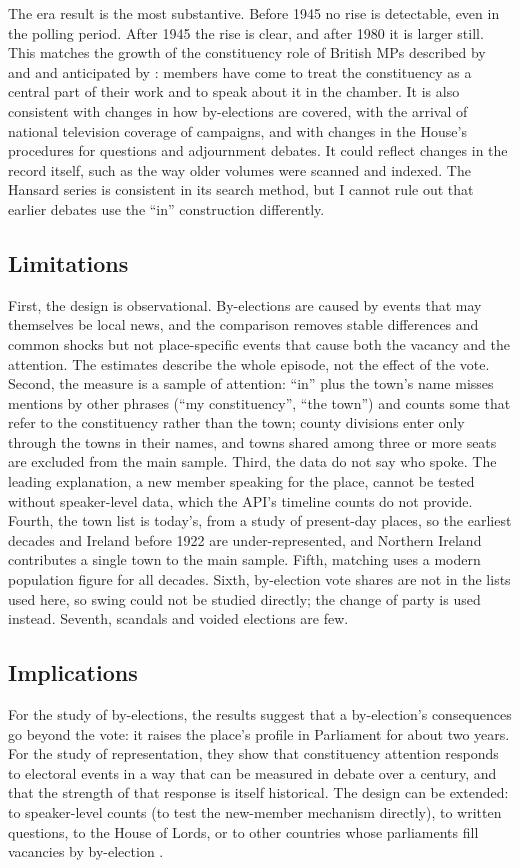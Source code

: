 \documentclass[11pt,a4paper]{article}
\begin{document}
The era result is the most substantive. Before 1945 no rise is detectable, even in the polling period. After 1945 the rise is clear, and after 1980 it is larger still. This matches the growth of the constituency role of British MPs described by \citet{norton1994} and \citet{norton1993} and anticipated by \citet{cain1987}: members have come to treat the constituency as a central part of their work and to speak about it in the chamber. It is also consistent with changes in how by-elections are covered, with the arrival of national television coverage of campaigns, and with changes in the House's procedures for questions and adjournment debates. It could reflect changes in the record itself, such as the way older volumes were scanned and indexed. The Hansard series is consistent in its search method, but I cannot rule out that earlier debates use the ``in'' construction differently.

\subsection{Limitations}
First, the design is observational. By-elections are caused by events that may themselves be local news, and the comparison removes stable differences and common shocks but not place-specific events that cause both the vacancy and the attention. The estimates describe the whole episode, not the effect of the vote. Second, the measure is a sample of attention: ``in'' plus the town's name misses mentions by other phrases (``my constituency'', ``the town'') and counts some that refer to the constituency rather than the town; county divisions enter only through the towns in their names, and towns shared among three or more seats are excluded from the main sample. Third, the data do not say who spoke. The leading explanation, a new member speaking for the place, cannot be tested without speaker-level data, which the API's timeline counts do not provide. Fourth, the town list is today's, from a study of present-day places, so the earliest decades and Ireland before 1922 are under-represented, and Northern Ireland contributes a single town to the main sample. Fifth, matching uses a modern population figure for all decades. Sixth, by-election vote shares are not in the lists used here, so swing could not be studied directly; the change of party is used instead. Seventh, scandals and voided elections are few.

\subsection{Implications}
For the study of by-elections, the results suggest that a by-election's consequences go beyond the vote: it raises the place's profile in Parliament for about two years. For the study of representation, they show that constituency attention responds to electoral events in a way that can be measured in debate over a century, and that the strength of that response is itself historical. The design can be extended: to speaker-level counts (to test the new-member mechanism directly), to written questions, to the House of Lords, or to other countries whose parliaments fill vacancies by by-election \citep{loewen2010,studlar1987}.
\end{document}
